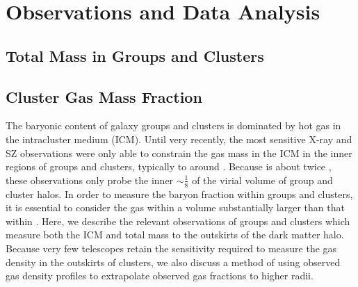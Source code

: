 \chapter{Observations and Data Analysis}
\label{chap:Data}

\section{Total Mass in Groups and Clusters}
\label{sec:Mass}


\section{Cluster Gas Mass Fraction}
\label{sec:Gas}
The baryonic content of galaxy groups and clusters is dominated by hot
gas in the intracluster medium (ICM). Until very recently, the most
sensitive X-ray and SZ observations were only able to constrain the
gas mass in the ICM in the inner regions of groups and clusters,
typically to around \rfive{} .  Because \rvir{} is about twice \rfive{},
these observations only probe the inner $\sim \frac{1}{8}$ of the
virial volume of group and cluster halos. In order to measure the
baryon fraction within groups and clusters, it is essential to
consider the gas within a volume substantially larger than that within
\rfive{}. Here, we describe the relevant observations of groups and
clusters which measure both the ICM and total mass to the outskirts of
the dark matter halo. Because very few telescopes retain the
sensitivity required to measure the gas density in the outskirts of
clusters, we also discuss a method of using observed gas density
profiles to extrapolate observed gas fractions to higher radii.

